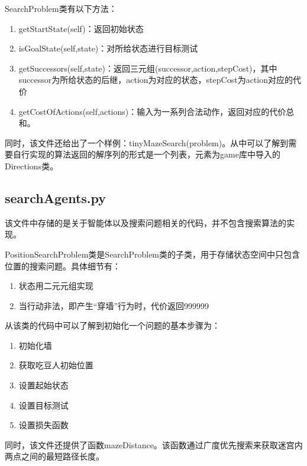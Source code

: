 SearchProblem类有以下方法：
\begin{enumerate}
    \item getStartState(self)：返回初始状态
    \item isGoalState(self,state)：对所给状态进行目标测试
    \item getSuccessors(self,state)：返回三元组(successor,action,stepCost)，其中successor为所给状态的后继，action为对应的状态，stepCost为action对应的代价
    \item getCostOfActions(self,actions)：输入为一系列合法动作，返回对应的代价总和。
\end{enumerate}
同时，该文件还给出了一个样例：tinyMazeSearch(problem)。从中可以了解到需要自行实现的算法返回的解序列的形式是一个列表，元素为game库中导入的Directions类。
\subsection{searchAgents.py}
该文件中存储的是关于智能体以及搜索问题相关的代码，并不包含搜索算法的实现。

PositionSearchProblem类是SearchProblem类的子类，用于存储状态空间中只包含位置的搜索问题。具体细节有：
\begin{enumerate}
\item 状态用二元元组实现
\item 当行动非法，即产生“穿墙”行为时，代价返回999999
\end{enumerate}
从该类的代码中可以了解到初始化一个问题的基本步骤为：
\begin{enumerate}
    \item 初始化墙
    \item 获取吃豆人初始位置
    \item 设置起始状态
    \item 设置目标测试
    \item 设置损失函数
\end{enumerate}
同时，该文件还提供了函数mazeDistance。该函数通过广度优先搜索来获取迷宫内两点之间的最短路径长度。